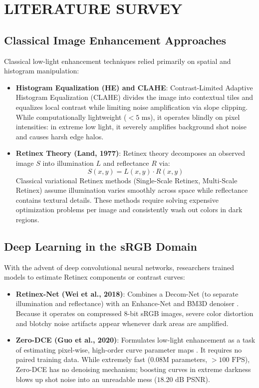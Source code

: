 \chapter{LITERATURE SURVEY}

\section{Classical Image Enhancement Approaches}
Classical low-light enhancement techniques relied primarily on spatial and histogram manipulation:
\begin{itemize}
    \item \textbf{Histogram Equalization (HE) and CLAHE}:
    Contrast-Limited Adaptive Histogram Equalization (CLAHE) divides the image into contextual tiles and equalizes local contrast while limiting noise amplification via slope clipping. While computationally lightweight ($< 5\text{ ms}$), it operates blindly on pixel intensities: in extreme low light, it severely amplifies background shot noise and causes harsh edge halos.
    \item \textbf{Retinex Theory (Land, 1977)}:
    Retinex theory \cite{land1977retinex} decomposes an observed image $S$ into illumination $L$ and reflectance $R$ via:
    \begin{equation}
    S(x, y) = L(x, y) \cdot R(x, y)
    \label{eq:retinex}
    \end{equation}
    Classical variational Retinex methods (Single-Scale Retinex, Multi-Scale Retinex) assume illumination varies smoothly across space while reflectance contains textural details. These methods require solving expensive optimization problems per image and consistently wash out colors in dark regions.
\end{itemize}

\section{Deep Learning in the sRGB Domain}
With the advent of deep convolutional neural networks, researchers trained models to estimate Retinex components or contrast curves:
\begin{itemize}
    \item \textbf{Retinex-Net (Wei et al., 2018)}:
    Combines a Decom-Net (to separate illumination and reflectance) with an Enhance-Net and BM3D denoiser \cite{wei2018deep}. Because it operates on compressed 8-bit sRGB images, severe color distortion and blotchy noise artifacts appear whenever dark areas are amplified.
    \item \textbf{Zero-DCE (Guo et al., 2020)}:
    Formulates low-light enhancement as a task of estimating pixel-wise, high-order curve parameter maps \cite{guo2020zero}. It requires no paired training data. While extremely fast ($0.08\text{M}$ parameters, $> 100\text{ FPS}$), Zero-DCE has no denoising mechanism; boosting curves in extreme darkness blows up shot noise into an unreadable mess ($18.20\text{ dB}$ PSNR).
\end{itemize}

